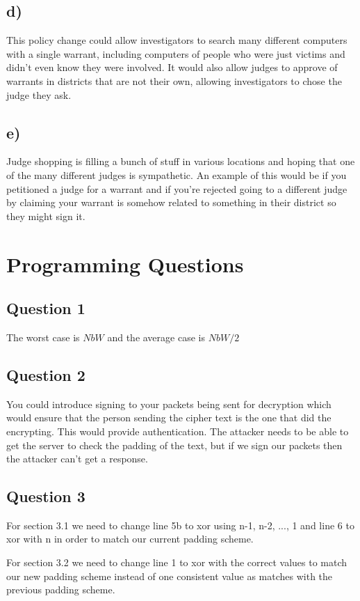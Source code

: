 \documentclass{article}
\begin{document}
\subsection{d)} %
\label{sub:d_}
This policy change could allow investigators to search many different computers with a single warrant, including computers of people who were just victims and didn't even know they were involved. It would also allow judges to approve of warrants in districts that are not their own, allowing investigators to chose the judge they ask.
\subsection{e)} %
\label{sub:e_}
Judge shopping is filling a bunch of stuff in various locations and hoping that one of the many different judges is sympathetic. An example of this would be if you petitioned a judge for a warrant and if you're rejected going to a different judge by claiming your warrant is somehow related to something in their district so they might sign it.



\section{Programming Questions} %
\label{sec:programming_questions}
\subsection{Question 1} %
\label{sub:question_1}
The worst case is $NbW$ and the average case is $NbW/2$

\subsection{Question 2} %
\label{sub:question_2}
You could introduce signing to your packets being sent for decryption which would ensure that the person sending the cipher text is the one that did the encrypting. This would provide authentication. The attacker needs to be able to get the server to check the padding of the text, but if we sign our packets then the attacker can't get a response. 

\subsection{Question 3} %
\label{sub:question_3}
For section 3.1 we need to change line 5b to xor using n-1, n-2, ..., 1 and line 6 to xor with n in order to match our current padding scheme.

For section 3.2 we need to change line 1 to xor with the correct values to match our new padding scheme instead of one consistent value as matches with the previous padding scheme.


\end{document}
